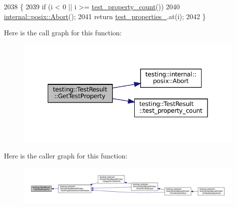 \begin{DoxyCode}
2038                                                            \{
2039   \textcolor{keywordflow}{if} (i < 0 || i >= \hyperlink{classtesting_1_1TestResult_afe4523257bbea8bc63b0950b702790be}{test\_property\_count}())
2040     \hyperlink{namespacetesting_1_1internal_1_1posix_a69b8278c59359dd6a6f941b4643db9fb}{internal::posix::Abort}();
2041   \textcolor{keywordflow}{return} \hyperlink{classtesting_1_1TestResult_a29cde491988faff4ef2d9f9b6c13d9fa}{test\_properties\_}.at(i);
2042 \}
\end{DoxyCode}
Here is the call graph for this function\+:
\nopagebreak
\begin{figure}[H]
\begin{center}
\leavevmode
\includegraphics[width=342pt]{classtesting_1_1TestResult_a6c2f478dbce36b57d18bedded46d70af_cgraph}
\end{center}
\end{figure}
Here is the caller graph for this function\+:
\nopagebreak
\begin{figure}[H]
\begin{center}
\leavevmode
\includegraphics[width=350pt]{classtesting_1_1TestResult_a6c2f478dbce36b57d18bedded46d70af_icgraph}
\end{center}
\end{figure}
\mbox{\label{classtesting_1_1TestResult_ad04e1d5d9eb623ba1d9fc82cdff43af4}} 

